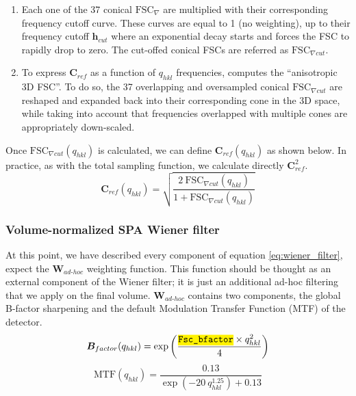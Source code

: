 \begin{enumerate}
    \item Each one of the 37 conical $\bm{\mathrm{FSC}}_{\nabla}$ are multiplied with their corresponding frequency cutoff curve. These curves are equal to 1 (no weighting), up to their frequency cutoff $\bm{h}_{cut}$ where an exponential decay starts and forces the FSC to rapidly drop to zero. The cut-offed conical FSCs are referred as $\bm{\mathrm{FSC}}_{\nabla cut}$.

    \item To express $\bm{C}_{ref}$ as a function of $q_{hkl}$ frequencies, {\emClarity} computes the ``anisotropic 3D FSC''. To do so, the 37 overlapping and oversampled conical $\bm{\mathrm{FSC}}_{\nabla cut}$ are reshaped and expanded back into their corresponding cone in the 3D space, while taking into account that frequencies overlapped with multiple cones are appropriately down-scaled.
\end{enumerate}

Once $\bm{\mathrm{FSC}}_{\nabla cut}(q_{hkl})$ is calculated, we can define $\bm{C}_{ref}(q_{hkl})$ as shown below. In practice, as with the total sampling function, we calculate directly $\bm{C}_{ref}^2$.
\begin{equation} \label{eq:cref3d}
    \bm{C}_{ref}(q_{hkl}) = \sqrt{\frac{ 2\ \bm{\mathrm{FSC}}_{\nabla cut}(q_{hkl}) }{ 1 + \bm{\mathrm{FSC}}_{\nabla cut}(q_{hkl}) }}
\end{equation}

\subsubsection{Volume-normalized SPA Wiener filter} \label{sec:algo:avg:wiener}

At this point, we have described every component of equation \ref{eq:wiener_filter}, expect the $\bm{W}_{ad\text{-}hoc}$ weighting function. This function should be thought as an external component of the Wiener filter; it is just an additional ad-hoc filtering that we apply on the final volume. $\bm{W}_{ad\text{-}hoc}$ contains two components, the global B-factor sharpening and the default Modulation Transfer Function (MTF) of the detector.
\begin{equation}
    \bm{B}_{factor}(q_{hkl}) = \exp\left( \frac{ \code{Fsc\_bfactor} \times q_{hkl}^{2} }{4} \right)
\end{equation}
\begin{equation} \label{eq:mtf}
    \bm{\mathrm{MTF}}(q_{hkl}) = \frac{0.13}{ \exp \left( -20\ q_{hkl}^{1.25} \right) + 0.13 }
\end{equation}

